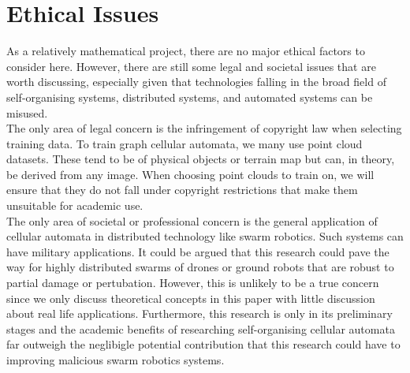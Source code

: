 \chapter{Ethical Issues}

As a relatively mathematical project, there are no major ethical factors to consider here. However, there are still some legal and societal issues that are worth discussing, especially given that technologies falling in the broad field of self-organising systems, distributed systems, and automated systems can be misused.\\

The only area of legal concern is the infringement of copyright law when selecting training data. To train graph cellular automata, we many use point cloud datasets. These tend to be of physical objects or terrain map but can, in theory, be derived from any image. When choosing point clouds to train on, we will ensure that they do not fall under copyright restrictions that make them unsuitable for academic use.\\

The only area of societal or professional concern is the general application of cellular automata in distributed technology like swarm robotics. Such systems can have military applications. It could be argued that this research could pave the way for highly distributed swarms of drones or ground robots that are robust to partial damage or pertubation. However, this is unlikely to be a true concern since we only discuss theoretical concepts in this paper with little discussion about real life applications. Furthermore, this research is only in its preliminary stages and the academic benefits of researching self-organising cellular automata far outweigh the neglibigle potential contribution that this research could have to improving malicious swarm robotics systems.\\
